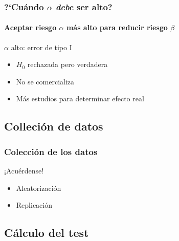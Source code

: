 \documentclass[mathserif]{beamer}
\begin{document}
\begin{frame}[label=betahigh2]
   \frametitle{?`Cu\'ando $\alpha$ \emph{debe} ser alto?}
   \framesubtitle{Aceptar riesgo $\alpha$ m\'as alto para reducir riesgo $\beta$  }
   \begin{block}{$\alpha$ alto: error de tipo I}
      \begin{itemize}
         \item $H_0$ rechazada pero verdadera 
         \item No se comercializa
         \item M\'as estudios para determinar efecto real
      \end{itemize}
   \end{block}

\end{frame}%


\subsection[Colleci\'on de datos]{Colleci\'on de datos}

\begin{frame}[label=datacoll]
   \frametitle{Colecci\'on de los datos}
   \begin{beamerboxesrounded}{¡Acu\'erdense!}
      \begin{itemize}
         \item Aleatorizaci\'on
         \item Replicaci\'on
      \end{itemize}
   \end{beamerboxesrounded}
\end{frame}%


\subsection[C\'alculo]{C\'alculo del test}
\end{document}
